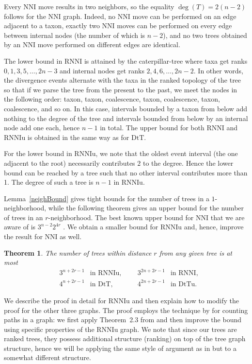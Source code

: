 \documentclass[11pt]{amsart}
\newtheorem{theorem}[lemma]{Theorem}
\theoremstyle{definition}
\newcommand{\nni}{\mathrm{NNI}}
\newcommand{\rnni}{\mathrm{RNNI}}
\newcommand{\rnniu}{\mathrm{RNNIu}}
\newcommand{\dtt}{\mathrm{DtT}}
\newcommand{\dttu}{\mathrm{DtTu}}
\begin{document}
Every $\nni$ move results in two neighbors, so the equality $\deg(T) = 2(n-2)$ follows for the $\nni$ graph.
Indeed, no $\nni$ move can be performed on an edge adjacent to a taxon, exactly two $\nni$ moves can be performed on every edge between internal nodes (the number of which is $n-2$), and no two trees obtained by an $\nni$ move performed on different edges are identical.

The lower bound in $\rnni$ is attained by the caterpillar-tree where taxa get ranks $0, 1, 3, 5, \ldots, 2n-3$ and internal nodes get ranks $2, 4, 6, \ldots, 2n-2$.
In other words, the divergence events alternate with the taxa in the ranked topology of the tree so that if we parse the tree from the present to the past, we meet the nodes in the following order: taxon, taxon, coalescence, taxon, coalescence, taxon, coalescence, and so on.
In this case, intervals bounded by a taxon from below add nothing to the degree of the tree and intervals bounded from below by an internal node add one each, hence $n-1$ in total.
The upper bound for both $\rnni$ and $\rnniu$ is obtained in the same way as for $\dtt$.

For the lower bound in $\rnniu$, we note that the oldest event interval (the one adjacent to the root) necessarily contributes $2$ to the degree.
Hence the lower bound can be reached by a tree such that no other interval contributes more than 1.
The degree of such a tree is $n-1$ in $\rnniu$.
\endproof

Lemma~\ref{neighBound} gives tight bounds for the number of trees in a $1$-neighborhood, while the following theorem gives an upper bound for the number of trees in an $r$-neighborhood.
The best known upper bound for $\nni$ that we are aware of is $3^{n-2} 2^{4r}$ \autocite{li1996some}.
We obtain a smaller bound for $\rnniu$ and, hence, improve the result for $\nni$ as well.

\begin{theorem}
\label{neighSizeTh}
The number of trees within distance $r$ from any given tree is at most
\begin{align*}
& 3^{n+2r-1}	& \mbox{in $\rnniu$,}
&&& 3^{2n+2r-1}	& \mbox{in $\rnni$,}\\
& 4^{n+2r-1}	& \mbox{in $\dtt$,}
&&& 4^{2n+2r-1}	& \mbox{in $\dttu$.}
\end{align*}
\end{theorem}

\proof
We describe the proof in detail for $\rnniu$ and then explain how to modify the proof for the other three graphs.
The proof employs the technique by \textcite{Sleator1992-bp} for counting paths in a graph: we first apply Theorem~2.3 from \autocite{Sleator1992-bp} and then improve the bound using specific properties of the $\rnniu$ graph.
We note that since our trees are ranked trees, they possess additional structure (ranking) on top of the tree graph structure, hence we will be applying the same style of argument as in \autocite{Sleator1992-bp} but to a somewhat different structure.
\end{document}
